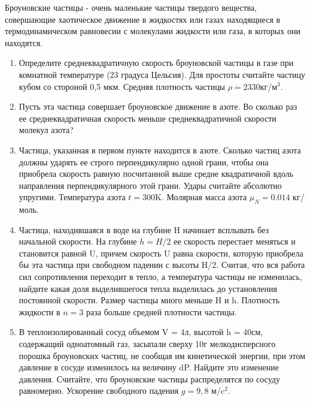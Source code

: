 
Броуновские частицы - очень маленькие частицы твердого вещества, совершающие хаотическое движение в 
жидкостях или газах находящиеся в термодинамическом равновесии с молекулами жидкости или газа, в которых 
они находятся.

\begin{enumerate}
    \item Определите среднеквадратичную скорость броуновской частицы в газе при комнатной температуре 
    (23 градуса Цельсия). Для простоты считайте частицу кубом со стороной 0,5 мкм. 
    Средняя плотность частицы $\rho=2330$кг/м$^3$.
    \item Пусть эта частица совершает броуновское движение в азоте. Во сколько раз ее среднеквадратичная 
    скорость меньше среднеквадратичной скорости молекул азота?
    \item Частица, указанная в первом пункте находится в азоте. Сколько частиц азота должны ударять ее 
    строго перпендикулярно одной грани, чтобы она приобрела скорость равную посчитанной выше средне 
    квадратичной вдоль направления перпендикулярного этой грани. Удары считайте абсолютно упругими. 
    Температура азота $t = 300$K. Молярная масса азота $\mu_N= 0.014$ кг/моль.
    \item Частица, находившаяся в воде на глубине H начинает всплывать без начальной скорости. На глубине 
    $h = H/2$ ее скорость перестает меняться и становится равной U, причем скорость U равна скорости, 
    которую приобрела бы эта частица при свободном падении с высоты H/2. Считая, что вся работа сил 
    сопротивления переходит в тепло, а температура частицы не изменилась, найдите какая доля выделившегося 
    тепла выделилась до установления постоянной скорости. Размер частицы много меньше H и h. Плотность 
    жидкости в $n=3$ раза больше средней плотности частицы.
    \item В теплоизолированный сосуд объемом V = 4л, высотой h = 40см, содержащий одноатомный газ, 
    засыпали сверху 10г мелкодисперсного порошка броуновских частиц, не сообщая им кинетической энергии, 
    при этом давление в сосуде изменилось на величину dP. Найдите это изменение давления. Считайте, что 
    броуновские частицы распределятся по сосуду равномерно. Ускорение свободного падения $g =9,8$ м/c$^2$.
\end{enumerate}